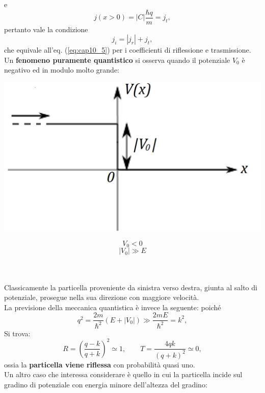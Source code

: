 \documentclass[a4paper,11pt,oneside]{book}
\begin{document}
e
\begin{equation}
j\left( x>0 \right) = |C| \frac{\hbar q}{m}= j_t,
\end{equation}
pertanto vale la condizione
\begin{equation}
j_i = |j_r|+ j_t,
\end{equation}
che equivale all'eq. (\ref{eq:cap10_5}) per i coefficienti di riflessione e trasmissione.\\
Un \textbf{fenomeno puramente quantistico} si osserva quando il potenziale $V_0$ è negativo ed in modulo molto grande:\\
\begin{minipage}{.7\textwidth}
\includegraphics[width=.9\textwidth]{immagini/cap_10/fig_10_6.png}
\end{minipage}
\hspace{.5cm}
\begin{minipage}{.1\textwidth}
\[V_0<0\]
\[|V_0| \gg E\]
\end{minipage}\\ \\
Classicamente la particella proveniente da sinistra verso destra, giunta al salto di potenziale, prosegue nella sua direzione con maggiore velocità.\\
La previsione della meccanica quantistica è invece la seguente: poiché
\begin{equation}
q^2=\frac{2m}{\hbar ^2}\left( E+ |V_0| \right) \gg \frac{2mE}{\hbar ^2} = k^2,
\end{equation}
Si trova:
\begin{equation}
R=\left( \frac{q-k}{q+k} \right) ^2 \simeq 1, \qquad T=\frac{4qk}{\left( q+k \right) ^2} \simeq 0,
\end{equation}
ossia la \textbf{particella viene riflessa} con probabilità quasi uno.\\
Un altro caso che interessa considerare è quello in cui la particella incide sul gradino di potenziale con energia minore dell'altezza del gradino:\\
\end{document}
